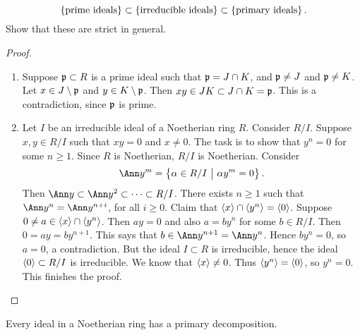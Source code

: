 \begin{exercise*}
$$ \cbr{\text{prime ideals}} \subset \cbr{\text{irreducible ideals}} \subset \cbr{\text{primary ideals}}. $$
Show that these are strict in general.
\end{exercise*}

\pagebreak

\begin{proof}
\hfill
\begin{enumerate}
\item Suppose $ \mathfrak{p} \subset R $ is a prime ideal such that $ \mathfrak{p} = J \cap K $, and $ \mathfrak{p} \ne J $ and $ \mathfrak{p} \ne K $. Let $ x \in J \setminus \mathfrak{p} $ and $ y \in K \setminus \mathfrak{p} $. Then $ xy \in JK \subset J \cap K = \mathfrak{p} $. This is a contradiction, since $ \mathfrak{p} $ is prime.
\item Let $ I $ be an irreducible ideal of a Noetherian ring $ R $. Consider $ R / I $. Suppose $ x, y \in R / I $ such that $ xy = 0 $ and $ x \ne 0 $. The task is to show that $ y^n = 0 $ for some $ n \ge 1 $. Since $ R $ is Noetherian, $ R / I $ is Noetherian. Consider
$$ \Ann y^m = \cbr{\alpha \in R / I \st \alpha y^m = 0}. $$
Then $ \Ann y \subset \Ann y^2 \subset \dots \subset R / I $. There exists $ n \ge 1 $ such that $ \Ann y^n = \Ann y^{n + i} $, for all $ i \ge 0 $. Claim that $ \left\langle x \right\rangle \cap \left\langle y^n \right\rangle = \left\langle 0 \right\rangle $. Suppose $ 0 \ne a \in \left\langle x \right\rangle \cap \left\langle y^n \right\rangle $. Then $ ay = 0 $ and also $ a = by^n $ for some $ b \in R / I $. Then $ 0 = ay = by^{n + 1} $. This says that $ b \in \Ann y^{n + 1} = \Ann y^n $. Hence $ by^n = 0 $, so $ a = 0 $, a contradiction. But the ideal $ I \subset R $ is irreducible, hence the ideal $ \left\langle 0 \right\rangle \subset R / I $ is irreducible. We know that $ \left\langle x \right\rangle \ne 0 $. Thus $ \left\langle y^n \right\rangle = \left\langle 0 \right\rangle $, so $ y^n = 0 $. This finishes the proof.
\end{enumerate}
\end{proof}


\begin{theorem}[Noether]
Every ideal in a Noetherian ring has a primary decomposition.
\end{theorem}

